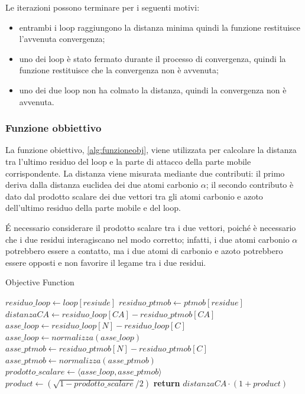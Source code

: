Le iterazioni possono terminare per i seguenti motivi:
\vspace{10pt}
\begin{itemize}
	\item entrambi i loop raggiungono la distanza minima quindi la funzione restituisce l'avvenuta convergenza;
	\vspace{5pt}
	\item uno dei loop è stato fermato durante il processo di convergenza, quindi la funzione restituisce che la convergenza non è avvenuta;
	\vspace{5pt}
	\item uno dei due loop non ha colmato la distanza, quindi la convergenza non è avvenuta.
\end{itemize}

\subsubsection{Funzione obbiettivo}\label{subsubsec:funzionetarget}
La funzione obiettivo, \ref{alg:funzioneobj}, viene utilizzata per calcolare la distanza tra l'ultimo residuo del loop e la parte di attacco della parte mobile corrispondente. La distanza viene misurata mediante due contributi: il primo deriva dalla distanza euclidea dei due atomi carbonio $\alpha$; il secondo contributo è dato dal prodotto scalare dei due vettori tra gli atomi carbonio e azoto dell'ultimo residuo della parte mobile e del loop. 

É necessario considerare il prodotto scalare tra i due vettori, poiché è necessario che i due residui interagiscano nel modo corretto; infatti, i due atomi carbonio $\alpha$ potrebbero essere a contatto, ma i due atomi di carbonio e azoto potrebbero essere opposti e non favorire il legame tra i due residui. 
 
\begin{algorithm}
	\caption{Objective Function}
	\label{alg:funzioneobj}
	\begin{algorithmic}
		\State $residuo\_loop \gets loop[resiude]$
		\State $residuo\_ptmob \gets ptmob[residue]$
		\State $distanzaCA \gets residuo\_loop[CA] - residuo\_ptmob[CA]$
		\State $asse\_loop \gets residuo\_loop[N] - residuo\_loop[C]$
		\State $asse\_loop \gets normalizza(asse\_loop)$
		\State $asse\_ptmob \gets residuo\_ptmob[N] - residuo\_ptmob[C]$
		\State $asse\_ptmob \gets normalizza(asse\_ptmob)$
		\State $prodotto\_scalare \gets \langle asse\_loop, asse\_ptmob \rangle$
		\State $product \gets (\sqrt{1-prodotto\_scalare}/2)$
		\State \textbf{return} $distanzaCA \cdot (1 + product)$
		\EndFunction
	\end{algorithmic}
\end{algorithm}

